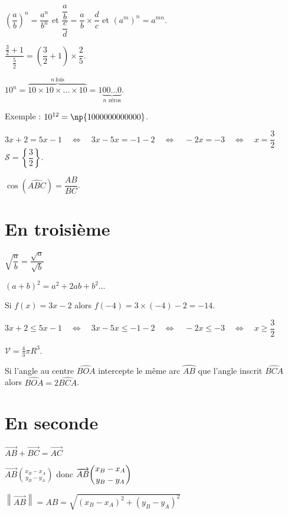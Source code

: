 \documentclass[10pt,french]{article}
\begin{document}
$\left(\dfrac a b\right)^n = \dfrac{a^n}{b^n}$ \quad et \quad
$\dfrac{\dfrac a b}{\dfrac c d} = \dfrac a b \times \dfrac d c$
\quad et \quad $\left(a^m\right)^n = a^{mn}$.\medskip

$\dfrac{\frac 32 + 1}{\frac 5 2} = \left(\dfrac 32 + 1\right) \times \dfrac 25$.\medskip

$10^n = \overbrace{10 \times 10 \times \dots \times 10}^{n\ \text{fois}}
    = 1\underbrace{00\dots0}_{n \text{ zéros}}.$\par\medskip
Exemple : $10^{12} = \np{1000000000000}$.\medskip

$3x + 2 = 5x - 1 \quad \Leftrightarrow \quad 3x - 5x = -1 -2
\quad \Leftrightarrow \quad -2x = -3
\quad \Leftrightarrow \quad  x = \dfrac 32$ \quad
$\mathcal S = \left\{\dfrac 32\right\}.$\medskip

$\cos\left(\widehat{ABC}\right) = \dfrac{AB}{BC}$.

\section{En troisième}

$\sqrt{\dfrac a b} = \dfrac{\sqrt a}{\sqrt b}$\medskip

$(a + b)^2 = a^2 + 2ab + b^2\dots$\medskip

Si $f(x) = 3x -2$ alors $f(-4) = 3 \times (-4) - 2 = -14$.\medskip

$3x + 2 \leqslant 5x - 1 \quad \Leftrightarrow \quad 3x - 5x \leqslant -1 -2
\quad \Leftrightarrow \quad -2x \leqslant -3
\quad \Leftrightarrow \quad  x \geqslant \dfrac 32$\medskip

$\mathcal V = \frac4 3 \pi R^3$.\medskip

Si l'angle au centre $\widehat{BOA}$ intercepte le même arc $\wideparen{AB}$
que l'angle inscrit $\widehat{BCA}$ alors $\widehat{BOA} = 2\widehat{BCA}$.

\section{En seconde}

$\overrightarrow{AB} + \overrightarrow{BC} = \overrightarrow{AC}$\medskip

$\overrightarrow{AB}\binom{x_B - x_A}{y_B - y_A}$ \quad donc \quad
$\overrightarrow{AB}\dbinom{x_B - x_A}{y_B - y_A}$\par\medskip
$\left\lVert \overrightarrow{AB} \right\rVert = AB = \sqrt{(x_B - x_A)^2 + (y_B - y_A)^2}$

\medskip
\end{document}
